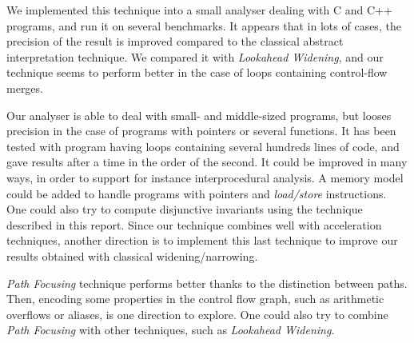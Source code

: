 \documentclass[a4paper,english,titlepage,11pt]{report}
\begin{document}
	We implemented this technique into a small analyser dealing with C and C++
	programs, and run it on several
	benchmarks.
	It appears that in lots of cases, 
	the precision of the result is improved 
	compared to the classical abstract interpretation technique.
	We compared it with \emph{Lookahead Widening}, and our technique seems to
	perform better in the case of loops containing control-flow merges. 

	Our analyser is able to deal with small- and middle-sized programs, but
	looses
	precision in the case of programs with pointers or several functions.
	It has been tested with program having loops containing several hundreds
	lines of code, and gave results after a time in the order of the second.
	It could be improved in many ways, in order to support
	for instance interprocedural analysis. A memory model could be added to
	handle programs with pointers and \emph{load/store} instructions.
	One could also try to compute disjunctive invariants using the technique
	described in this report.
	Since our technique combines well with acceleration techniques, another
	direction is to implement this last technique to improve our results
	obtained with classical widening/narrowing.
	

	\emph{Path Focusing} technique performs better thanks to the distinction
	between
	paths. Then, encoding some properties in the control flow graph, such as
	arithmetic overflows or aliases, is one direction to explore. One could also
	try to combine \emph{Path Focusing} with other techniques, such as
	\emph{Lookahead Widening}.



  

  \appendix
\appendixpage
\renewcommand{\thesection}{\Alph{section}}
\end{document}

